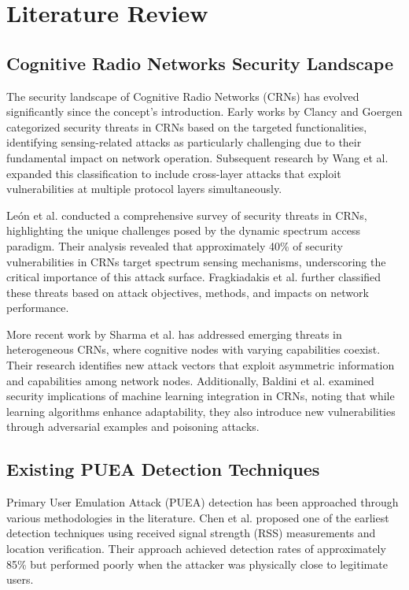 \chapter{Literature Review}

\section{Cognitive Radio Networks Security Landscape}

The security landscape of Cognitive Radio Networks (CRNs) has evolved significantly since the concept's introduction. Early works by Clancy and Goergen \cite{clancy2008security} categorized security threats in CRNs based on the targeted functionalities, identifying sensing-related attacks as particularly challenging due to their fundamental impact on network operation. Subsequent research by Wang et al. \cite{wang2010security} expanded this classification to include cross-layer attacks that exploit vulnerabilities at multiple protocol layers simultaneously.

León et al. \cite{leon2012security} conducted a comprehensive survey of security threats in CRNs, highlighting the unique challenges posed by the dynamic spectrum access paradigm. Their analysis revealed that approximately 40\% of security vulnerabilities in CRNs target spectrum sensing mechanisms, underscoring the critical importance of this attack surface. Fragkiadakis et al. \cite{fragkiadakis2013survey} further classified these threats based on attack objectives, methods, and impacts on network performance.

More recent work by Sharma et al. \cite{sharma2015security} has addressed emerging threats in heterogeneous CRNs, where cognitive nodes with varying capabilities coexist. Their research identifies new attack vectors that exploit asymmetric information and capabilities among network nodes. Additionally, Baldini et al. \cite{baldini2017security} examined security implications of machine learning integration in CRNs, noting that while learning algorithms enhance adaptability, they also introduce new vulnerabilities through adversarial examples and poisoning attacks.

\section{Existing PUEA Detection Techniques}

Primary User Emulation Attack (PUEA) detection has been approached through various methodologies in the literature. Chen et al. \cite{chen2008defense} proposed one of the earliest detection techniques using received signal strength (RSS) measurements and location verification. Their approach achieved detection rates of approximately 85\% but performed poorly when the attacker was physically close to legitimate users.

